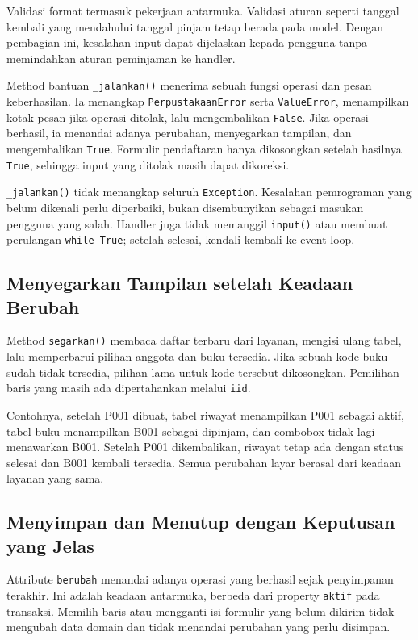 Validasi format termasuk pekerjaan antarmuka. Validasi aturan seperti tanggal kembali yang mendahului tanggal pinjam tetap berada pada model. Dengan pembagian ini, kesalahan input dapat dijelaskan kepada pengguna tanpa memindahkan aturan peminjaman ke handler.

Method bantuan \texttt{\_jalankan()} menerima sebuah fungsi operasi dan pesan keberhasilan. Ia menangkap \texttt{PerpustakaanError} serta \texttt{ValueError}, menampilkan kotak pesan jika operasi ditolak, lalu mengembalikan \texttt{False}. Jika operasi berhasil, ia menandai adanya perubahan, menyegarkan tampilan, dan mengembalikan \texttt{True}. Formulir pendaftaran hanya dikosongkan setelah hasilnya \texttt{True}, sehingga input yang ditolak masih dapat dikoreksi.

\texttt{\_jalankan()} tidak menangkap seluruh \texttt{Exception}. Kesalahan pemrograman yang belum dikenali perlu diperbaiki, bukan disembunyikan sebagai masukan pengguna yang salah. Handler juga tidak memanggil \texttt{input()} atau membuat perulangan \texttt{while True}; setelah selesai, kendali kembali ke event loop.

\subsection{Menyegarkan Tampilan setelah Keadaan Berubah}

Method \texttt{segarkan()} membaca daftar terbaru dari layanan, mengisi ulang tabel, lalu memperbarui pilihan anggota dan buku tersedia. Jika sebuah kode buku sudah tidak tersedia, pilihan lama untuk kode tersebut dikosongkan. Pemilihan baris yang masih ada dipertahankan melalui \texttt{iid}.

Contohnya, setelah P001 dibuat, tabel riwayat menampilkan P001 sebagai aktif, tabel buku menampilkan B001 sebagai dipinjam, dan combobox tidak lagi menawarkan B001. Setelah P001 dikembalikan, riwayat tetap ada dengan status selesai dan B001 kembali tersedia. Semua perubahan layar berasal dari keadaan layanan yang sama.

\subsection{Menyimpan dan Menutup dengan Keputusan yang Jelas}

Attribute \texttt{berubah} menandai adanya operasi yang berhasil sejak penyimpanan terakhir. Ini adalah keadaan antarmuka, berbeda dari property \texttt{aktif} pada transaksi. Memilih baris atau mengganti isi formulir yang belum dikirim tidak mengubah data domain dan tidak menandai perubahan yang perlu disimpan.

